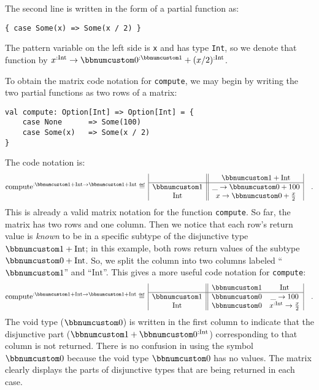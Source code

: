 The second line is written in the form of a partial function as:
\begin{lstlisting}
{ case Some(x) => Some(x / 2) }
\end{lstlisting}
The pattern variable on the left side is \lstinline!x! and has type
\lstinline!Int!, so we denote that function by $x^{:\text{Int}}\rightarrow\bbnum 0^{:\bbnum 1}+(x/2)^{:\text{Int}}$. 

To obtain the matrix code notation for \lstinline!compute!, we may
begin by writing the two partial functions as two rows of a matrix:
\begin{lstlisting}
val compute: Option[Int] => Option[Int] = {
    case None      => Some(100)
    case Some(x)   => Some(x / 2)
}
\end{lstlisting}
The code notation is:
\[
\text{compute}^{:\bbnum 1+\text{Int}\rightarrow\bbnum 1+\text{Int}}\triangleq\,\begin{array}{|c||c|}
 & \bbnum 1+\text{Int}\\
\hline \bbnum 1 & \_\rightarrow\bbnum 0+100\\
\text{Int} & x\rightarrow\bbnum 0+\frac{x}{2}
\end{array}\quad.
\]
This is already a valid matrix notation for the function \lstinline!compute!.
So far, the matrix has two rows and one column. Then we notice that
each row\textsf{'}s return value is \emph{known} to be in a specific subtype
of the disjunctive type $\bbnum 1+\text{Int}$; in this example, both
rows return values of the subtype $\bbnum 0+\text{Int}$. So, we split
the column into two columns labeled \textsf{``}$\bbnum 1$\textsf{''} and \textsf{``}$\text{Int}$\textsf{''}.
This gives a more useful code notation for \lstinline!compute!:
\[
\text{compute}^{:\bbnum 1+\text{Int}\rightarrow\bbnum 1+\text{Int}}\triangleq\,\begin{array}{|c||cc|}
 & \bbnum 1 & \text{Int}\\
\hline \bbnum 1 & \bbnum 0 & \_\rightarrow100\\
\text{Int} & \bbnum 0 & x^{:\text{Int}}\rightarrow\frac{x}{2}
\end{array}\quad.
\]
The void type ($\bbnum 0$) is
written in the first column to indicate that the disjunctive part
($\bbnum 1+\bbnum 0^{:\text{Int}}$) corresponding to that column
is not returned. There is no confusion in using the symbol $\bbnum 0$
because the void type $\bbnum 0$ has no values. The matrix clearly
displays the parts of disjunctive types that are being returned in
each case.

